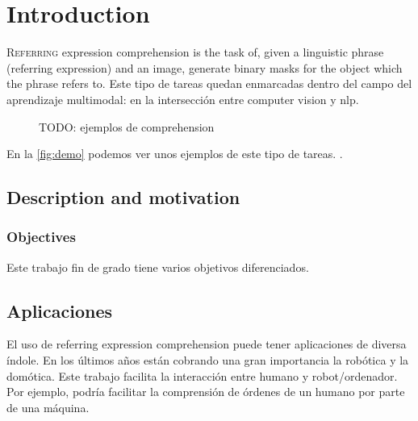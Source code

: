 

\chapter{Introduction}



\lettrine{R}{eferring} expression comprehension is the task of, given a
linguistic phrase (referring expression) and an image, generate binary masks
for the object which the phrase refers to. Este tipo de tareas quedan
enmarcadas dentro del campo del aprendizaje multimodal: en la intersección
entre computer vision y \gls{nlp}.

\begin{figure}[ht]
  \centering
  \caption[TODO]{TODO: ejemplos de comprehension}
  \label{fig:demo}
\end{figure}

En la \vref{fig:demo} podemos ver unos ejemplos de este tipo de tareas.
.


\section{Description and motivation}

\subsection{Objectives}

Este trabajo fin de grado tiene varios objetivos diferenciados.



\section{Aplicaciones}

El uso de referring expression comprehension puede tener aplicaciones de
diversa índole. En los últimos años están cobrando una gran importancia la
robótica y la domótica. Este trabajo facilita la interacción entre humano y
robot/ordenador. Por ejemplo, podría facilitar la comprensión de órdenes de un
humano por parte de una máquina.

